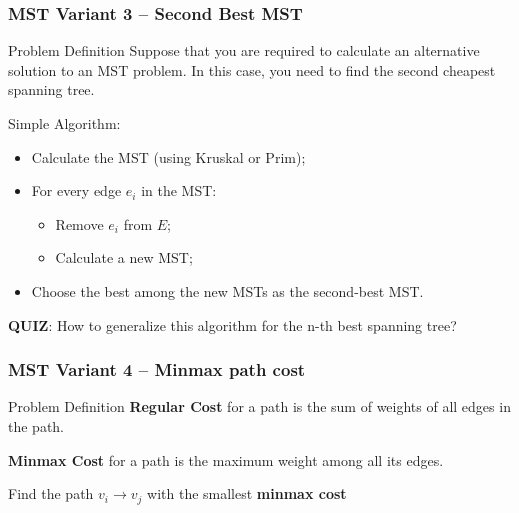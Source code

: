 \begin{frame}
  \frametitle{MST Variant 3 -- Second Best MST}
  \begin{block}{Problem Definition}
    Suppose that you are required to calculate an alternative solution to an MST problem. In this case, you need to find the second cheapest spanning tree.
  \end{block}
  \bigskip

  Simple Algorithm:
  \begin{itemize}
    \item Calculate the MST (using Kruskal or Prim);
    \item For every edge $e_i$ in the MST:
    \begin{itemize}
      \item Remove $e_i$ from $E$;
      \item Calculate a new MST;
    \end{itemize}
    \item Choose the best among the new MSTs as the second-best MST.
  \end{itemize}
  \bigskip

  {\bf QUIZ}: How to generalize this algorithm for the n-th best spanning tree?
\end{frame}

\begin{frame}
  \frametitle{MST Variant 4 -- Minmax path cost}

  \begin{center}
    \end{center}

  \begin{block}{Problem Definition}
    {\bf Regular Cost} for a path is the sum of weights of all edges in the path.\bigskip

    {\bf Minmax Cost} for a path is the maximum weight among all its edges.\bigskip

    Find the path $v_i \to v_j$ with the smallest {\bf minmax cost}
  \end{block}
\end{frame}

